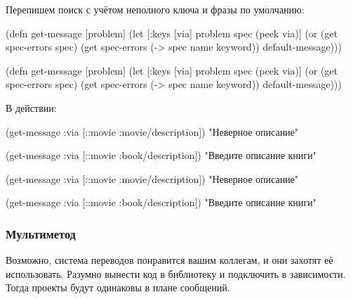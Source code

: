 \fi

Перепишем поиск с учётом неполного ключа и фразы по умолчанию:

\ifx\DEVICETYPE\MOBILE

\begin{english}
  \begin{clojure}
(defn get-message
  [problem]
  (let [{:keys [via]} problem
        spec (peek via)]
    (or (get spec-errors spec)
        (get spec-errors
          (-> spec name keyword))
        default-message)))
  \end{clojure}
\end{english}

\else

\begin{english}
  \begin{clojure}
(defn get-message
  [problem]
  (let [{:keys [via]} problem
        spec (peek via)]
    (or (get spec-errors spec)
        (get spec-errors (-> spec name keyword))
        default-message)))
  \end{clojure}
\end{english}

\fi

\noindent
В действии:

\ifx\DEVICETYPE\MOBILE

  \begin{clojure}
(get-message
  {:via [::movie :movie/description]})
"Неверное описание"

(get-message
  {:via [::movie :book/description]})
"Введите описание книги"
  \end{clojure}

\else

  \begin{clojure}
(get-message {:via [::movie :movie/description]})
"Неверное описание"

(get-message {:via [::movie :book/description]})
"Введите описание книги"
  \end{clojure}

\fi

\subsubsection{Мультиметод}

Возможно, система переводов понравится вашим коллегам, и они захотят её
использовать. Разумно вынести код в библиотеку и подключить в зависимости. Тогда
проекты будут одинаковы в плане сообщений.

